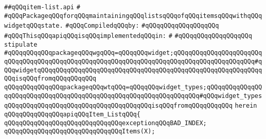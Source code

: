 \label{src/lib/x-kit/widget/old/leaf/item-list.api}
\verb|##qQQqitem-list.api|\newline
\verb|#|\newline
\verb|#qQQqPackageqQQqforqQQqmaintainingqQQqlistsqQQqofqQQqitemsqQQqwithqQQqwidgetqQQqstate.|\newline
\newline
\verb|#qQQqCompiledqQQqby:|\newline
\verb|#qQQqqQQqqQQqqQQqqQQq|\newline
\newline
\newline
\newline
\verb|#qQQqThisqQQqapiqQQqisqQQqimplementedqQQqin:|\newline
\verb|#|\newline
\verb|#qQQqqQQqqQQqqQQqqQQq|\newline
\newline
\newline
\newline
\verb|stipulate|\newline
\verb|#qQQqqQQqqQQqpackageqQQqwgqQQq=qQQqqQQqwidget;qQQqqQQqqQQqqQQqqQQqqQQqqQQqqQQqqQQqqQQqqQQqqQQqqQQqqQQqqQQqqQQqqQQqqQQqqQQqqQQqqQQqqQQqqQQq#qQQqwidgetqQQqqQQqqQQqqQQqqQQqqQQqqQQqqQQqqQQqqQQqqQQqqQQqqQQqqQQqqQQqqQQqisqQQqfromqQQqqQQqqQQq|\newline
\verb|qQQqqQQqqQQqqQQqpackageqQQqwtqQQq=qQQqqQQqwidget_types;qQQqqQQqqQQqqQQqqQQqqQQqqQQqqQQqqQQqqQQqqQQqqQQqqQQqqQQqqQQqqQQqqQQq#qQQqwidget_typesqQQqqQQqqQQqqQQqqQQqqQQqqQQqqQQqqQQqqQQqisqQQqfromqQQqqQQqqQQq|\newline
\verb|herein|\newline
\newline
\verb|qQQqqQQqqQQqqQQqapiqQQqItem_ListqQQq{|\newline
\newline
\verb|qQQqqQQqqQQqqQQqqQQqqQQqqQQqqQQqexceptionqQQqBAD_INDEX;|\newline
\newline
\verb|qQQqqQQqqQQqqQQqqQQqqQQqqQQqqQQqItems(X);|\newline
\newline
